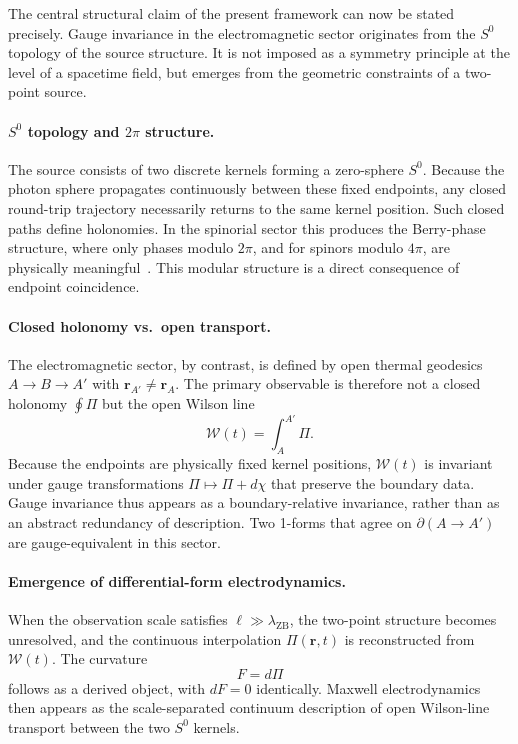 \documentclass[%
 reprint, amsmath,amssymb, aps, prb, ]{revtex4-2}
\numberwithin{equation}{section}
\newcommand{\WL}{\mathcal{W}}
\begin{document}
The central structural claim of the present framework can now be stated precisely. Gauge invariance in the electromagnetic sector originates from the $S^0$ topology of the source structure. It is not imposed as a symmetry principle at the level of a spacetime field, but emerges from the geometric constraints of a two-point source.

\paragraph{$S^0$ topology and $2\pi$ structure.}
The source consists of two discrete kernels forming a zero-sphere $S^0$. Because the photon sphere propagates continuously between these fixed endpoints, any closed round-trip trajectory necessarily returns to the same kernel position. Such closed paths define holonomies. In the spinorial sector this produces the Berry-phase structure, where only phases modulo $2\pi$, and for spinors modulo $4\pi$, are physically meaningful~\cite{Berry1984,hanamura29}. This modular structure is a direct consequence of endpoint coincidence.

\paragraph{Closed holonomy vs.\ open transport.}
The electromagnetic sector, by contrast, is defined by open thermal geodesics $A\to B\to A'$ with $\mathbf{r}_{A'}\neq\mathbf{r}_A$. The primary observable is therefore not a closed holonomy $\oint\Pi$ but the open Wilson line
\begin{equation}
\WL(t) = \int_A^{A'}\Pi.
\label{eq:WL_primary}
\end{equation}
Because the endpoints are physically fixed kernel positions, $\WL(t)$ is invariant under gauge transformations $\Pi\mapsto\Pi+d\chi$ that preserve the boundary data. Gauge invariance thus appears as a boundary-relative invariance, rather than as an abstract redundancy of description. Two 1-forms that agree on $\partial(A\to A')$ are gauge-equivalent in this sector.

\paragraph{Emergence of differential-form electrodynamics.}
When the observation scale satisfies $\ell\gg\lambda_{\text{ZB}}$, the two-point structure becomes unresolved, and the continuous interpolation $\Pi(\mathbf{r},t)$ is reconstructed from $\WL(t)$. The curvature
\begin{equation}
F = d\Pi
\label{eq:F_recall}
\end{equation}
follows as a derived object, with $dF=0$ identically. Maxwell electrodynamics then appears as the scale-separated continuum description of open Wilson-line transport between the two $S^0$ kernels.
\end{document}
